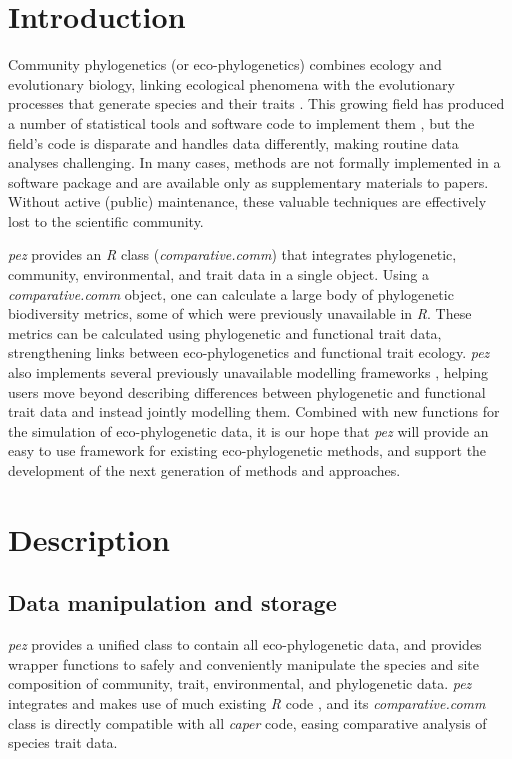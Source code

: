 \documentclass{bioinfo}
\begin{document}
\section{Introduction}
Community phylogenetics (or eco-phylogenetics) combines ecology and
evolutionary biology, linking ecological phenomena with the
evolutionary processes that generate species and their traits
\citep[see][]{Webb2002}. This growing field has produced a number of
statistical tools and software code to implement them
\citep[\emph{e.g.},][]{Kembel2010}, but the field's code is disparate
and handles data differently, making routine data analyses
challenging. In many cases, methods are not formally implemented in a
software package and are available only as supplementary materials to
papers. Without active (public) maintenance, these valuable techniques
are effectively lost to the scientific community.

\emph{pez} provides an \emph{R} \citep{R2015} class
(\emph{comparative.comm}) that integrates phylogenetic, community,
environmental, and trait data in a single object. Using a
\emph{comparative.comm} object, one can calculate a large body of
phylogenetic biodiversity metrics, some of which were previously
unavailable in \emph{R}. These metrics can be calculated using
phylogenetic and functional trait data, strengthening links between
eco-phylogenetics and functional trait ecology. \emph{pez} also
implements several previously unavailable modelling frameworks
\citep{Cavender-Bares2004,Ives2011,Rafferty2013}, helping users move
beyond describing differences between phylogenetic and functional
trait data and instead jointly modelling them. Combined with new
functions for the simulation of eco-phylogenetic data, it is our hope
that \emph{pez} will provide an easy to use framework for existing
eco-phylogenetic methods, and support the development of the next
generation of methods and approaches.
\section{Description}
\subsection{Data manipulation and storage}
\emph{pez} provides a unified class to contain all eco-phylogenetic
data, and provides wrapper functions to safely and conveniently
manipulate the species and site composition of community, trait,
environmental, and phylogenetic data. \emph{pez} integrates and makes
use of much existing \emph{R} code
\citep{Bortolussi2012,Genz2013,Koenker2015,Labierte2014,Oksanen2015,Paradis2004},
and its \emph{comparative.comm} class is directly compatible with all
\emph{caper} \citep{Orme2013} code, easing comparative analysis of
species trait data.
\end{document}
